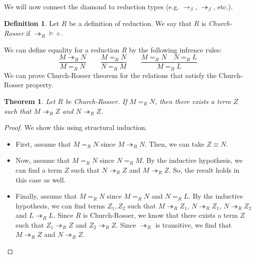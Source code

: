 \documentclass[a4paper, openany]{memoir}
\newtheorem{theorem}[proposition]{Theorem}
\theoremstyle{definition}
\newtheorem{definition}[proposition]{Definition}
\begin{document}
    We will now connect the diamond to reduction types (e.g. $\to_\beta$, $\twoheadrightarrow_\beta$, etc.).
    \begin{definition}
        Let $R$ be a definition of reduction. We say that $R$ is \emph{Church-Rosser} if $\twoheadrightarrow_R {\vDash \diamond}$.
    \end{definition}
    We can define equality for a reduction $R$ by the following infrence rules:
    \[\frac{M \twoheadrightarrow_R N}{M =_R N} \qquad \frac{M =_R N}{N =_R M} \qquad \frac{M =_R N \quad N =_R L}{M =_R L}\]
    \noindent We can prove Church-Rosser theorem for the relations that satisfy the Church-Rosser property.
    \begin{theorem}
        Let $R$ be Church-Rosser. If $M =_R N$, then there exists a term $Z$ such that $M \twoheadrightarrow_R Z$ and $N \twoheadrightarrow_R Z$.
    \end{theorem}
    \begin{proof}
        We show this using structural induction. 
        \begin{itemize}
            \item First, assume that $M =_R N$ since $M \twoheadrightarrow_R N$. Then, we can take $Z \equiv N$.
            
            \item Now, assume that $M =_R N$ since $N =_R M$. By the inductive hypothesis, we can find a term $Z$ such that $N \twoheadrightarrow_R Z$ and $M \twoheadrightarrow_R Z$. So, the result holds in this case as well.
            
            \item Finally, assume that $M =_R N$ since $M =_R N$ and $N =_R L$. By the inductive hypothesis, we can find terms $Z_1, Z_2$ such that $M \twoheadrightarrow_R Z_1$, $N \twoheadrightarrow_R Z_1$, $N \twoheadrightarrow_R Z_2$ and $L \twoheadrightarrow_R L$. Since $R$ is Church-Rosser, we know that there exists a term $Z$ such that $Z_1 \twoheadrightarrow_R Z$ and $Z_2 \twoheadrightarrow_R Z$. Since $\twoheadrightarrow_R$ is transitive, we find that $M \twoheadrightarrow_R Z$ and $N \twoheadrightarrow_R Z$.
        \end{itemize}
    \end{proof}
\end{document}
